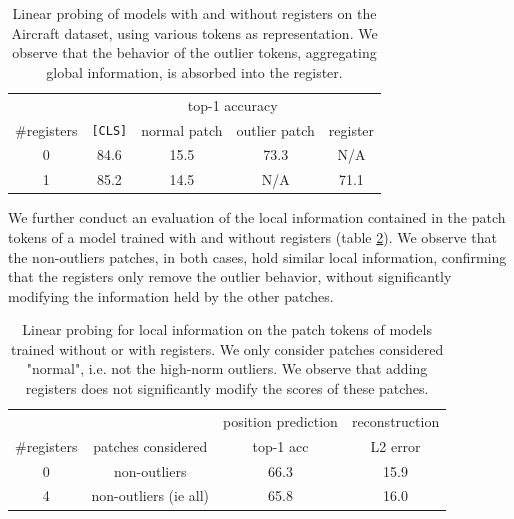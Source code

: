 \begin{table}[h]
    \centering
    \begin{tabular}{ccccc}
         \toprule
            & \multicolumn{4}{c}{top-1 accuracy} \\
         \#registers & \texttt{[CLS]} & normal patch & outlier patch & register \\
         \midrule
         0 & 84.6 & 15.5 & 73.3 & N/A \\
         1 & 85.2 & 14.5 & N/A & 71.1 \\
         \bottomrule
    \end{tabular}
    \caption{Linear probing of models with and without registers on the Aircraft dataset, using various tokens as representation. We observe that the behavior of the outlier tokens, aggregating global information, is absorbed into the register.}
    \label{tab:classif_logreg_token_types-acc}
\end{table}

We further conduct an evaluation of the local information contained in the patch tokens of a model trained with and without registers (table \ref{tab:classif_logreg_token_types-pos}). We observe that the non-outliers patches, in both cases, hold similar local information, confirming that the registers only remove the outlier behavior, without significantly modifying the information held by the other patches.




\begin{table}[h]
    \centering
    \begin{tabular}{cccc}
         \toprule
          & & position prediction & reconstruction \\
         \#registers& patches considered & top-1 acc & L2 error  \\
         \midrule
         0 & non-outliers & 66.3 & 15.9  \\
         4 & non-outliers (ie all) & 65.8 & 16.0  \\
        \bottomrule
    \end{tabular}
    \caption{Linear probing for local information on the patch tokens of models trained without or with registers. We only consider patches considered "normal", i.e. not the high-norm outliers. We observe that adding registers does not significantly modify the scores of these patches.}
    \label{tab:classif_logreg_token_types-pos}
\end{table}



